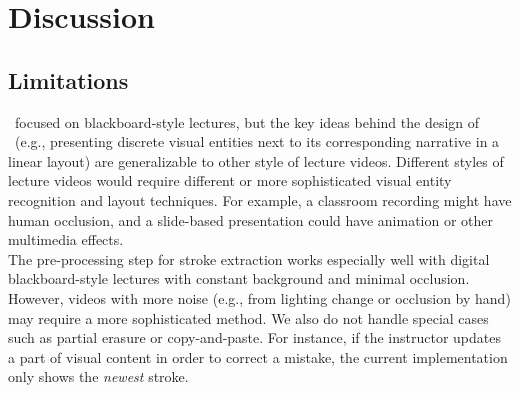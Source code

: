 \section{Discussion}
\label{sec:discussion}
\subsection{Limitations}
\systemname\ focused on blackboard-style lectures, but the key ideas behind the design of \systemname\ (e.g., presenting discrete visual entities next to its corresponding narrative in a linear layout) are generalizable to other style of lecture videos. Different styles of lecture videos would require different or more sophisticated visual entity recognition and layout techniques. For example, a classroom recording might have human occlusion, and a slide-based presentation could have animation or other multimedia effects.\\

The pre-processing step for stroke extraction works especially well with digital blackboard-style lectures with constant background and minimal occlusion. However, videos with more noise (e.g., from lighting change or occlusion by hand) may require a more sophisticated method. We also do not handle special cases
such as partial erasure or copy-and-paste.  For instance, if the instructor
updates a part of visual content in order to correct a mistake, the current
implementation only shows the \textit{newest} stroke.\\

